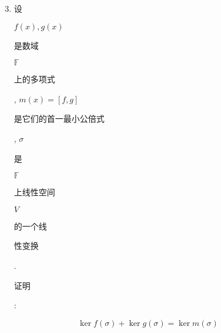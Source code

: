 \documentclass[10pt]{article}
\begin{document}
\begin{enumerate}
  \setcounter{enumi}{2}
  \item \begin{CJK}{UTF8}{mj}设\end{CJK} $f(x), g(x)$ \begin{CJK}{UTF8}{mj}是数域\end{CJK} $\mathbb{F}$ \begin{CJK}{UTF8}{mj}上的多项式\end{CJK}, $m(x)=[f, g]$ \begin{CJK}{UTF8}{mj}是它们的首一最小公倍式\end{CJK}, $\sigma$ \begin{CJK}{UTF8}{mj}是\end{CJK} $\mathbb{F}$ \begin{CJK}{UTF8}{mj}上线性空间\end{CJK} $V$ \begin{CJK}{UTF8}{mj}的一个线\end{CJK} \begin{CJK}{UTF8}{mj}性变换\end{CJK}. \begin{CJK}{UTF8}{mj}证明\end{CJK}:
\end{enumerate}
$$
\operatorname{ker} f(\sigma)+\operatorname{ker} g(\sigma)=\operatorname{ker} m(\sigma)
$$
\end{document}
